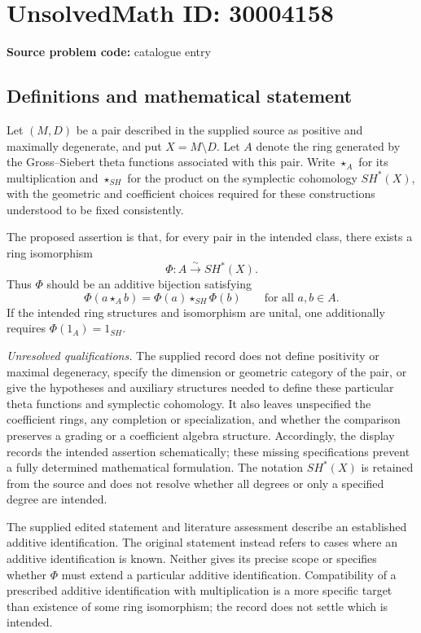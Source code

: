 \documentclass[11pt]{article}
\begin{document}
\section*{UnsolvedMath ID: 30004158}
\textbf{Source problem code:} catalogue entry
\subsection{Definitions and mathematical statement}
Let \((M,D)\) be a pair described in the supplied source as positive and maximally degenerate, and put \(X=M\setminus D\). Let \(A\) denote the ring generated by the Gross--Siebert theta functions associated with this pair. Write \(\star_A\) for its multiplication and \(\star_{SH}\) for the product on the symplectic cohomology \(SH^*(X)\), with the geometric and coefficient choices required for these constructions understood to be fixed consistently.

The proposed assertion is that, for every pair in the intended class, there exists a ring isomorphism
\[
\Phi:A\xrightarrow{\sim}SH^*(X).
\]
Thus \(\Phi\) should be an additive bijection satisfying
\[
\Phi(a\star_A b)=\Phi(a)\star_{SH}\Phi(b)
\qquad\text{for all }a,b\in A.
\]
If the intended ring structures and isomorphism are unital, one additionally requires \(\Phi(1_A)=1_{SH}\).

\textit{Unresolved qualifications.} The supplied record does not define positivity or maximal degeneracy, specify the dimension or geometric category of the pair, or give the hypotheses and auxiliary structures needed to define these particular theta functions and symplectic cohomology. It also leaves unspecified the coefficient rings, any completion or specialization, and whether the comparison preserves a grading or a coefficient algebra structure. Accordingly, the display records the intended assertion schematically; these missing specifications prevent a fully determined mathematical formulation. The notation \(SH^*(X)\) is retained from the source and does not resolve whether all degrees or only a specified degree are intended.

The supplied edited statement and literature assessment describe an established additive identification. The original statement instead refers to cases where an additive identification is known. Neither gives its precise scope or specifies whether \(\Phi\) must extend a particular additive identification. Compatibility of a prescribed additive identification with multiplication is a more specific target than existence of some ring isomorphism; the record does not settle which is intended.
\end{document}
